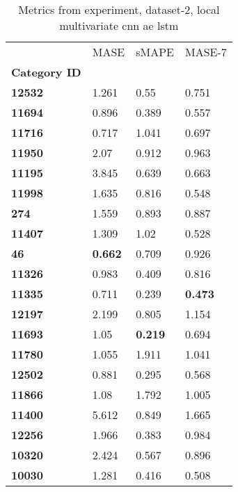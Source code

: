 \begin{table}[H]
\centering
\caption{Metrics from experiment, dataset-2, local multivariate cnn ae lstm}
\label{table:local-multivariate-cnn-ae-lstm-dataset-2}
\begin{tabular}{llll}
\toprule
{} &            MASE &           sMAPE &          MASE-7 \\
\textbf{Category ID} &                 &                 &                 \\
\midrule
\textbf{12532      } &           1.261 &            0.55 &           0.751 \\
\textbf{11694      } &           0.896 &           0.389 &           0.557 \\
\textbf{11716      } &           0.717 &           1.041 &           0.697 \\
\textbf{11950      } &            2.07 &           0.912 &           0.963 \\
\textbf{11195      } &           3.845 &           0.639 &           0.663 \\
\textbf{11998      } &           1.635 &           0.816 &           0.548 \\
\textbf{274        } &           1.559 &           0.893 &           0.887 \\
\textbf{11407      } &           1.309 &            1.02 &           0.528 \\
\textbf{46         } &  \textbf{0.662} &           0.709 &           0.926 \\
\textbf{11326      } &           0.983 &           0.409 &           0.816 \\
\textbf{11335      } &           0.711 &           0.239 &  \textbf{0.473} \\
\textbf{12197      } &           2.199 &           0.805 &           1.154 \\
\textbf{11693      } &            1.05 &  \textbf{0.219} &           0.694 \\
\textbf{11780      } &           1.055 &           1.911 &           1.041 \\
\textbf{12502      } &           0.881 &           0.295 &           0.568 \\
\textbf{11866      } &            1.08 &           1.792 &           1.005 \\
\textbf{11400      } &           5.612 &           0.849 &           1.665 \\
\textbf{12256      } &           1.966 &           0.383 &           0.984 \\
\textbf{10320      } &           2.424 &           0.567 &           0.896 \\
\textbf{10030      } &           1.281 &           0.416 &           0.508 \\
\bottomrule
\end{tabular}
\end{table}
